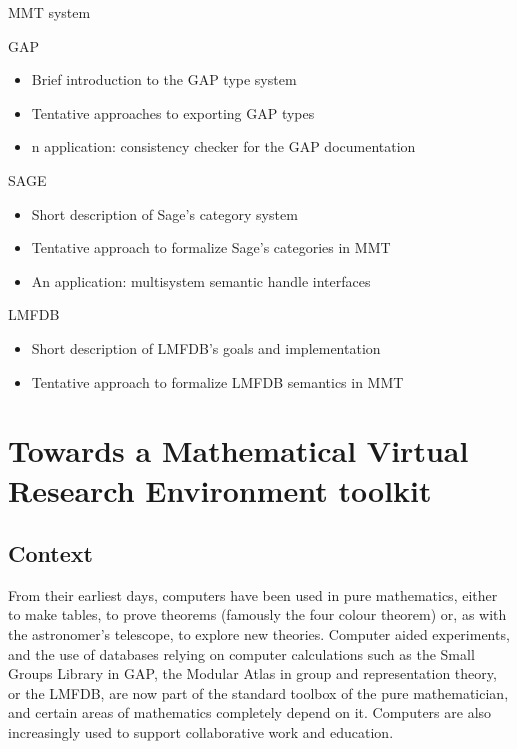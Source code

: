 \documentclass{llncs}
\begin{document}
\begin{description}
\item{MMT system}
\item{GAP} 
\begin{itemize}
\item Brief introduction to the GAP type system 
\item Tentative approaches to exporting GAP types 
\item n application: consistency checker for the GAP documentation
\end{itemize}
\item{SAGE} 
\begin{itemize}
\item Short description of Sage's category system 
\item Tentative approach to formalize Sage's categories in MMT 
\item An application: multisystem semantic handle interfaces
\end{itemize}
\item{LMFDB}
\begin{itemize}
\item Short description of LMFDB's goals and implementation 
\item Tentative approach to formalize LMFDB semantics in MMT
\end{itemize}
\end{description}


\section{Towards a Mathematical Virtual Research Environment toolkit}


\subsection{Context}


From their earliest days, computers have been used in pure
mathematics, either to make tables, to prove theorems (famously the
four colour theorem) or, as with the astronomer's telescope, to
explore new theories. Computer aided experiments, and the use of
databases relying on computer calculations such as the Small Groups
Library in GAP, the Modular Atlas in group and representation theory,
or the LMFDB, are now part of the standard toolbox of the pure
mathematician, and certain areas of mathematics completely depend on
it. Computers are also increasingly used to support collaborative work
and education.
\end{document}

